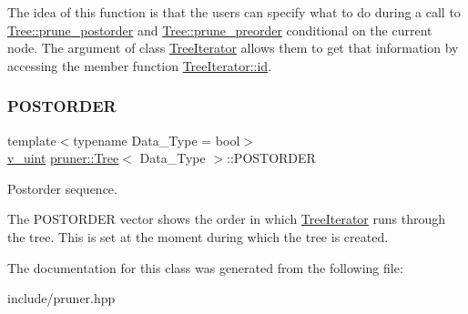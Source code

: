 The idea of this function is that the users can specify what to do during a call to \hyperlink{classpruner_1_1Tree_a7e50f34814e6f158cbff23dbe0312a8e}{Tree\+::prune\+\_\+postorder} and \hyperlink{classpruner_1_1Tree_a960ac327488daa6b2de86ea7be5aee7d}{Tree\+::prune\+\_\+preorder} conditional on the current node. The argument of class \hyperlink{classpruner_1_1TreeIterator}{Tree\+Iterator} allows them to get that information by accessing the member function \hyperlink{classpruner_1_1TreeIterator_a526f5f2b7f6c6b93c5c4575ca5aba17d}{Tree\+Iterator\+::id}. \mbox{\label{classpruner_1_1Tree_aa93805054bcd43cca478cc5a825bc99a}} 
\subsubsection{\texorpdfstring{P\+O\+S\+T\+O\+R\+D\+ER}{POSTORDER}}
{\footnotesize\ttfamily template$<$typename Data\+\_\+\+Type = bool$>$ \\
\hyperlink{namespacepruner_af0145646bd7ede012cd336b416bc5579}{v\+\_\+uint} \hyperlink{classpruner_1_1Tree}{pruner\+::\+Tree}$<$ Data\+\_\+\+Type $>$\+::P\+O\+S\+T\+O\+R\+D\+ER\hspace{0.3cm}{\ttfamily [protected]}}



Postorder sequence. 

The P\+O\+S\+T\+O\+R\+D\+ER vector shows the order in which \hyperlink{classpruner_1_1TreeIterator}{Tree\+Iterator} runs through the tree. This is set at the moment during which the tree is created. 

The documentation for this class was generated from the following file\+:\begin{DoxyCompactItemize}
\item 
include/pruner.\+hpp\end{DoxyCompactItemize}
